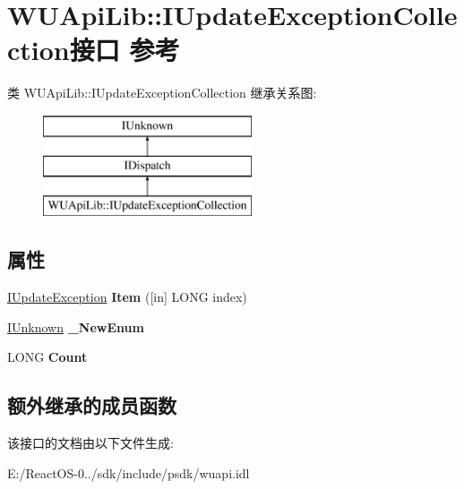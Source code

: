 \hypertarget{interface_w_u_api_lib_1_1_i_update_exception_collection}{}\section{W\+U\+Api\+Lib\+:\+:I\+Update\+Exception\+Collection接口 参考}
\label{interface_w_u_api_lib_1_1_i_update_exception_collection}
类 W\+U\+Api\+Lib\+:\+:I\+Update\+Exception\+Collection 继承关系图\+:\begin{figure}[H]
\begin{center}
\leavevmode
\includegraphics[height=3.000000cm]{interface_w_u_api_lib_1_1_i_update_exception_collection}
\end{center}
\end{figure}
\subsection*{属性}
\begin{DoxyCompactItemize}
\item 
\mbox{\label{interface_w_u_api_lib_1_1_i_update_exception_collection_aeba5f90fe9f65437b9672757000989cc}} 
\hyperlink{interface_w_u_api_lib_1_1_i_update_exception}{I\+Update\+Exception} {\bfseries Item} (\mbox{[}in\mbox{]} L\+O\+NG index)
\item 
\mbox{\label{interface_w_u_api_lib_1_1_i_update_exception_collection_a02d7df15329f7d8bb159e67d0c5c8e62}} 
\hyperlink{interface_i_unknown}{I\+Unknown} {\bfseries \+\_\+\+New\+Enum}
\item 
\mbox{\label{interface_w_u_api_lib_1_1_i_update_exception_collection_a2bfce778d2e2b314cb70dede51a2df73}} 
L\+O\+NG {\bfseries Count}
\end{DoxyCompactItemize}
\subsection*{额外继承的成员函数}


该接口的文档由以下文件生成\+:\begin{DoxyCompactItemize}
\item 
E\+:/\+React\+O\+S-\/0../sdk/include/psdk/wuapi.\+idl\end{DoxyCompactItemize}
